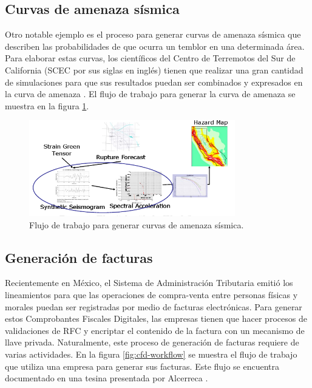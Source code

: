 \subsection{Curvas de amenaza sísmica}
Otro notable ejemplo es el proceso para generar curvas de amenaza sísmica que describen las probabilidades de que ocurra un temblor en una determinada área. Para elaborar estas curvas, los científicos del Centro de Terremotos del Sur de California (SCEC por sus siglas en inglés) tienen que realizar una gran cantidad de simulaciones para que sus resultados puedan ser combinados y expresados en la curva de amenaza \cite{deelman2006managing}. El flujo de trabajo para generar la curva de amenaza se muestra en la figura \ref{fig:scec-workflow}.

\begin{figure}
    \begin{center}
        \includegraphics[width=0.8\textwidth]{imagenes/scec-workflow}
    \end{center}
    \caption{Flujo de trabajo para generar curvas de amenaza sísmica.}
    \label{fig:scec-workflow}
\end{figure}

\subsection{Generación de facturas}
Recientemente en México, el Sistema de Administración Tributaria emitió los lineamientos para que las operaciones de compra-venta entre personas físicas y morales puedan ser registradas por medio de facturas electrónicas. Para generar estos Comprobantes Fiscales Digitales, las empresas tienen que hacer procesos de validaciones de RFC y encriptar el contenido de la factura con un mecanismo de llave privada. Naturalmente, este proceso de generación de facturas requiere de varias actividades. En la figura \ref{fig:cfd-workflow} se muestra el flujo de trabajo que utiliza una empresa para generar sus facturas. Este flujo se encuentra documentado en una tesina presentada por Alcerreca \cite{alcerreca2013cfd}.

